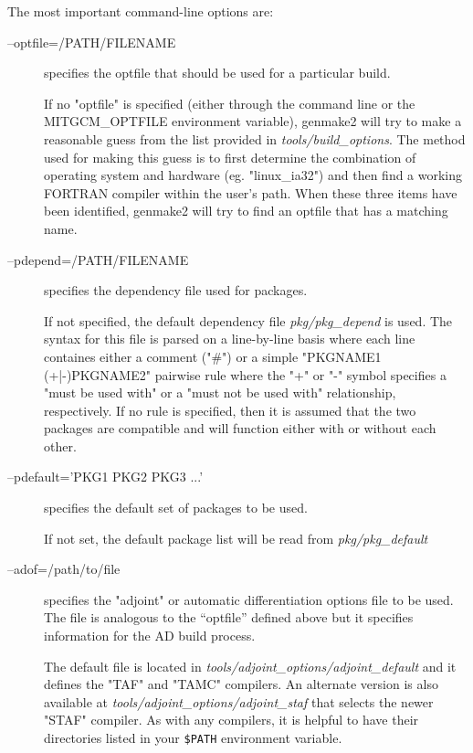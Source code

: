 The most important command-line options are:
\begin{description}
  
\item[--optfile=/PATH/FILENAME] specifies the optfile that should be
  used for a particular build.
  
  If no "optfile" is specified (either through the command line or the
  MITGCM\_OPTFILE environment variable), genmake2 will try to make a
  reasonable guess from the list provided in {\em
    tools/build\_options}.  The method used for making this guess is
  to first determine the combination of operating system and hardware
  (eg. "linux\_ia32") and then find a working FORTRAN compiler within
  the user's path.  When these three items have been identified,
  genmake2 will try to find an optfile that has a matching name.
  
\item[--pdepend=/PATH/FILENAME] specifies the dependency file used for
  packages.
  
  If not specified, the default dependency file {\em pkg/pkg\_depend}
  is used.  The syntax for this file is parsed on a line-by-line basis
  where each line containes either a comment ("\#") or a simple
  "PKGNAME1 (+|-)PKGNAME2" pairwise rule where the "+" or "-" symbol
  specifies a "must be used with" or a "must not be used with"
  relationship, respectively.  If no rule is specified, then it is
  assumed that the two packages are compatible and will function
  either with or without each other.
  
\item[--pdefault='PKG1 PKG2 PKG3 ...'] specifies the default set of
  packages to be used.
  
  If not set, the default package list will be read from {\em
    pkg/pkg\_default}
  
\item[--adof=/path/to/file] specifies the "adjoint" or automatic
  differentiation options file to be used.  The file is analogous to
  the ``optfile'' defined above but it specifies information for the
  AD build process.
  
  The default file is located in {\em
    tools/adjoint\_options/adjoint\_default} and it defines the "TAF"
  and "TAMC" compilers.  An alternate version is also available at
  {\em tools/adjoint\_options/adjoint\_staf} that selects the newer
  "STAF" compiler.  As with any compilers, it is helpful to have their
  directories listed in your {\tt \$PATH} environment variable.
  

\end{description}
